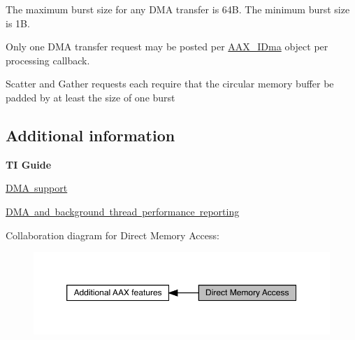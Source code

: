 \begin{DoxyItemize}
\item The maximum burst size for any D\+MA transfer is 64B. The minimum burst size is 1B. \item Only one D\+MA transfer request may be posted per \mbox{\hyperlink{a01809}{A\+A\+X\+\_\+\+I\+Dma}} object per processing callback. \item Scatter and Gather requests each require that the circular memory buffer be padded by at least the size of one burst\end{DoxyItemize}
\hypertarget{a00810_alg_dma_additionalinformation}{}\subsection{Additional information}\label{a00810_alg_dma_additionalinformation}
{\bfseries{TI Guide}} \begin{DoxyItemize}
\item \mbox{\hyperlink{a00832_subsubsection__dma_support_}{D\+MA support}} \item \mbox{\hyperlink{a00832_subsubsection__dma_and_background_thread_performance_reporting_}{D\+MA and background thread performance reporting}} \end{DoxyItemize}
Collaboration diagram for Direct Memory Access\+:
\nopagebreak
\begin{figure}[H]
\begin{center}
\leavevmode
\includegraphics[width=350pt]{a00810}
\end{center}
\end{figure}
